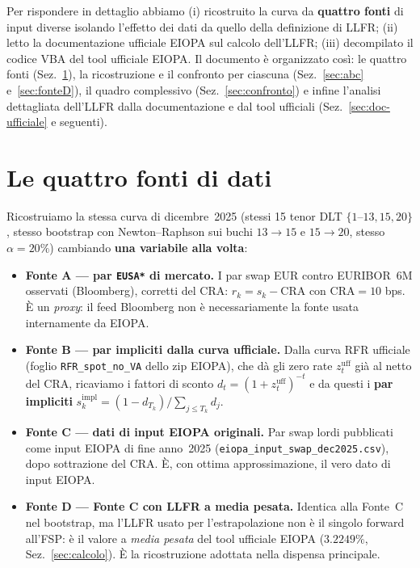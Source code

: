 \documentclass[11pt,a4paper]{article}
\theoremstyle{definition}
\theoremstyle{remark}
\newcommand{\CRA}{\mathrm{CRA}}
\begin{document}
Per rispondere in dettaglio abbiamo (i) ricostruito la curva da \textbf{quattro fonti} di
input diverse isolando l'effetto dei dati da quello della definizione di LLFR; (ii) letto la
documentazione ufficiale EIOPA sul calcolo dell'LLFR; (iii) decompilato il codice VBA del tool
ufficiale EIOPA. Il documento \`e organizzato cos\`i: le quattro fonti
(Sez.~\ref{sec:fonti}), la ricostruzione e il confronto per ciascuna (Sez.~\ref{sec:abc}
e~\ref{sec:fonteD}), il quadro complessivo (Sez.~\ref{sec:confronto}) e infine l'analisi
dettagliata dell'LLFR dalla documentazione e dal tool ufficiali (Sez.~\ref{sec:doc-ufficiale}
e seguenti).

\section{Le quattro fonti di dati}
\label{sec:fonti}

Ricostruiamo la stessa curva di dicembre~2025 (stessi 15 tenor DLT $\{1$--$13,15,20\}$, stesso
bootstrap con Newton--Raphson sui buchi $13\!\to\!15$ e $15\!\to\!20$, stesso $\alpha=20\%$)
cambiando \textbf{una variabile alla volta}:

\begin{itemize}
  \item \textbf{Fonte A --- par \texttt{EUSA*} di mercato.} I par swap EUR contro EURIBOR~6M
        osservati (Bloomberg), corretti del $\CRA$: $r_k = s_k - \CRA$ con $\CRA=10$ bps.
        \`E un \emph{proxy}: il feed Bloomberg non \`e necessariamente la fonte usata
        internamente da EIOPA.
  \item \textbf{Fonte B --- par impliciti dalla curva ufficiale.} Dalla curva RFR ufficiale
        (foglio \texttt{RFR\_spot\_no\_VA} dello zip EIOPA), che d\`a gli zero rate
        $z_t^{\text{uff}}$ gi\`a al netto del CRA, ricaviamo i fattori di sconto
        $d_t=(1+z_t^{\text{uff}})^{-t}$ e da questi i \textbf{par impliciti}
        $s_k^{\text{impl}}=(1-d_{T_k})/\sum_{j\le T_k}d_j$.
  \item \textbf{Fonte C --- dati di input EIOPA originali.} Par swap lordi pubblicati come
        input EIOPA di fine anno~2025 (\texttt{eiopa\_input\_swap\_dec2025.csv}), dopo sottrazione del
        $\CRA$. \`E, con ottima approssimazione, il vero dato di input EIOPA.
  \item \textbf{Fonte D --- Fonte C con LLFR a media pesata.} Identica alla Fonte~C nel
        bootstrap, ma l'LLFR usato per l'estrapolazione non \`e il singolo forward all'FSP:
        \`e il valore a \emph{media pesata} del tool ufficiale EIOPA ($3.2249\%$,
        Sez.~\ref{sec:calcolo}). \`E la ricostruzione adottata nella dispensa principale.
\end{itemize}
\end{document}
